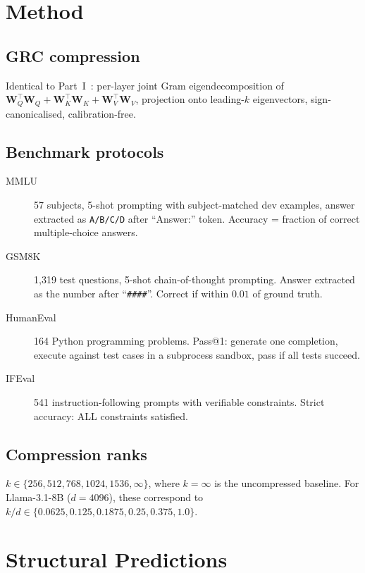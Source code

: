 \documentclass[11pt]{article}
\providecommand{\Wmat}{\mathbf{W}}
\begin{document}
\section{Method}
\label{sec:method}

\subsection{GRC compression}
Identical to Part~I~\cite{stewart2026grc}: per-layer joint Gram
eigendecomposition of $\Wmat_Q^\top\Wmat_Q+\Wmat_K^\top\Wmat_K+
\Wmat_V^\top\Wmat_V$, projection onto leading-$k$ eigenvectors,
sign-canonicalised, calibration-free.

\subsection{Benchmark protocols}

\begin{description}
\item[MMLU] 57 subjects, 5-shot prompting with subject-matched dev
      examples, answer extracted as \texttt{A/B/C/D} after ``Answer:''
      token.  Accuracy = fraction of correct multiple-choice answers.

\item[GSM8K] 1,319 test questions, 5-shot chain-of-thought prompting.
      Answer extracted as the number after ``\texttt{\#\#\#\#}''.
      Correct if within $0.01$ of ground truth.

\item[HumanEval] 164 Python programming problems.  Pass@1: generate one
      completion, execute against test cases in a subprocess sandbox,
      pass if all tests succeed.

\item[IFEval] 541 instruction-following prompts with verifiable
      constraints.  Strict accuracy: ALL constraints satisfied.
\end{description}

\subsection{Compression ranks}
$k\in\{256,512,768,1024,1536,\infty\}$, where $k{=}\infty$ is the
uncompressed baseline.  For Llama-3.1-8B ($d{=}4096$), these correspond
to $k/d\in\{0.0625,0.125,0.1875,0.25,0.375,1.0\}$.

\section{Structural Predictions}
\label{sec:predictions}
\end{document}
